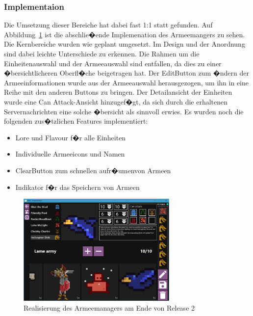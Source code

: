 \documentclass[12pt, titlepage]{scrartcl}
\newcommand{\Abb}[1]{%
	Abbildung\ \ref{#1}%
}
\begin{document}
			\subsubsection{Implementaion} Die Umsetzung dieser Bereiche hat dabei fast 1:1 statt gefunden. Auf \Abb{ImplementierungArmeemanager} ist die abschlie�ende Implemenation des Armeemangers zu sehen. Die Kernbereiche wurden wie geplant umgesetzt. Im Design und der Anordnung sind dabei leichte Unterschiede zu erkennen. Die Rahmen um die Einheitenauswahl und der Armeeauswahl sind entfallen, da dies zu einer �bersichtlicheren Oberfl�che beigetragen hat. Der \glqq Edit\grqq Button zum �ndern der Armeeinformationen wurde aus der Armeeauswahl herausgezogen, um ihn in eine Reihe mit den anderen Buttons zu bringen. Der Detailansicht der Einheiten wurde eine \glqq Can Attack\grqq-Ansicht hinzugef�gt, da sich durch die erhaltenen Servernachrichten eine solche �bersicht als sinnvoll erwies.
			Es wurden noch die folgenden zus�tzlichen Features implementiert:
			\begin{itemize}
				\item Lore und Flavour f�r alle Einheiten
				\item Individuelle Armeeicons und Namen
				\item \glqq Clear\grqq Button zum schnellen \glqq aufr�umen\grqq von Armeen
				\item Indikator f�r das Speichern von Armeen
			\end{itemize}
			
			\begin{figure}[H] 
				\centering
				\includegraphics[width=0.7\textwidth]{ArmyBuilder_final.PNG}
				\caption{Realisierung des Armeemanagers am Ende von Release 2}
				\label{ImplementierungArmeemanager}
			\end{figure}
		
\end{document}

